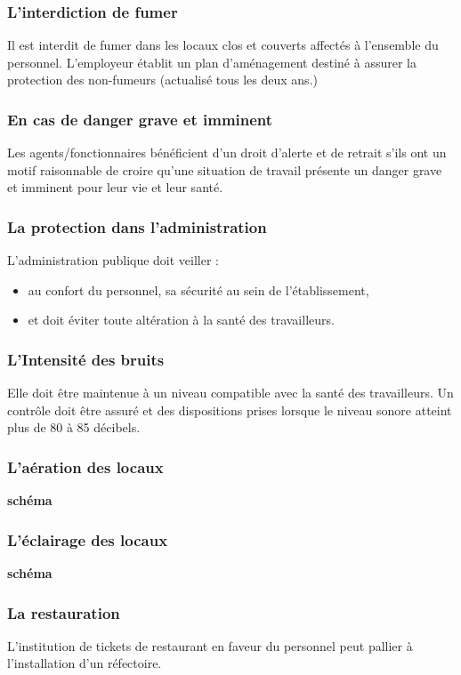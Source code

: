 \documentclass{beamer}
\begin{document}
\begin{frame}
\frametitle{L’interdiction de fumer}
Il est interdit de fumer dans les locaux clos et couverts affectés à l’ensemble du personnel.
L’employeur établit un plan d’aménagement destiné à assurer la protection des non-fumeurs (actualisé tous les deux ans.)
\end{frame}

\begin{frame}
\frametitle{En cas de danger grave et imminent}
Les agents/fonctionnaires bénéficient d’un droit d’alerte et de retrait s’ils ont un motif raisonnable de croire qu’une situation de travail présente un danger grave et imminent pour leur vie et leur santé.
\end{frame}

\begin{frame}
\frametitle{La protection dans l’administration}
L’administration publique doit veiller :
\begin{itemize}
\item au confort du personnel,
 sa sécurité au sein de l’établissement,
\item et doit éviter toute altération à la santé des travailleurs.
\end{itemize}
\end{frame}

\begin{frame}
\frametitle{L’Intensité des bruits}
Elle doit être maintenue à un niveau compatible avec la santé des travailleurs.
Un contrôle doit être assuré et des dispositions prises lorsque le niveau sonore atteint plus de 80 à 85 décibels.
\end{frame}

\begin{frame}
\frametitle{L’aération des locaux}
\textbf{schéma}
\end{frame}

\begin{frame}
\frametitle{L’éclairage des locaux}
\textbf{schéma}
\end{frame}

\begin{frame}
\frametitle{La restauration}
L’institution de tickets de restaurant en faveur du personnel peut pallier à l’installation d’un réfectoire.
\end{frame}
\end{document}
